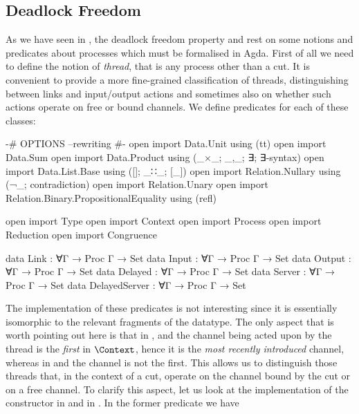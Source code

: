 \subsection{Deadlock Freedom}
\label{sec:deadlock-freedom-agda}

As we have seen in , the deadlock freedom property and
 rest on some notions and predicates about processes which must be
formalised in Agda. First of all we need to define the notion of \emph{thread},
that is any process other than a cut. It is convenient to provide a more
fine-grained classification of threads, distinguishing between links and
input/output actions and sometimes also on whether such actions operate on free
or bound channels. We define predicates for each of these classes:

\begin{code}[hide]
{-# OPTIONS --rewriting #-}
open import Data.Unit using (tt)
open import Data.Sum
open import Data.Product using (_×_; _,_; ∃; ∃-syntax)
open import Data.List.Base using ([]; _∷_; [_])
open import Relation.Nullary using (¬_; contradiction)
open import Relation.Unary
open import Relation.Binary.PropositionalEquality using (refl)

open import Type
open import Context
open import Process
open import Reduction
open import Congruence
\end{code}

\begin{code}
data Link           : ∀{Γ} → Proc Γ → Set
data Input          : ∀{Γ} → Proc Γ → Set
data Output         : ∀{Γ} → Proc Γ → Set
data Delayed        : ∀{Γ} → Proc Γ → Set
data Server         : ∀{Γ} → Proc Γ → Set
data DelayedServer  : ∀{Γ} → Proc Γ → Set
\end{code}

The implementation of these predicates is not interesting since it is
essentially isomorphic to the relevant fragments of the 
datatype. The only aspect that is worth pointing out here is that in
,  and  the
channel being acted upon by the thread is the \emph{first} in $\Context$, hence
it is the \emph{most recently introduced} channel, whereas in
 and  the channel is not the
first. This allows us to distinguish those threads that, in the context of a
cut, operate on the channel bound by the cut or on a free channel. To clarify
this aspect, let us look at the implementation of the constructor
 in  and in
. In the former predicate we have

